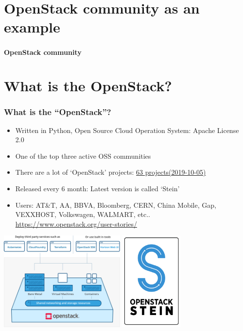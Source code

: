 \documentclass[aspectratio=169,11pt,hyperref={colorlinks=true}]{beamer}
\begin{document}
\section{OpenStack community as an example}
\begin{frame}
  \frametitle{ }
  \Huge{\bf{OpenStack community}}
\end{frame}

\section{What is the OpenStack?}
\begin{frame}
  \frametitle{What is the ``OpenStack''?}
  \begin{itemize}
    \item Written in Python, Open Source Cloud Operation System: Apache License 2.0
    \item One of the top three active OSS communities
    \item There are a lot of `OpenStack' projects: \href{http://governance.openstack.org/reference/projects/index.html}{63 projects(2019-10-05)}
    \item Released every 6 month: Latest version is called `Stein'
    \item Users: \scriptsize{AT\&T, AA, BBVA, Bloomberg, CERN,
      China Mobile, Gap, VEXXHOST,
      Volkswagen, WALMART, etc.. \url{https://www.openstack.org/user-stories/}}
  \end{itemize}
  \begin{center}
    \includegraphics[height=50mm]{images/openstack-simple.png}
    \includegraphics[height=50mm]{images/stein-release-logo.png}
  \end{center}
\end{frame}
\end{document}
